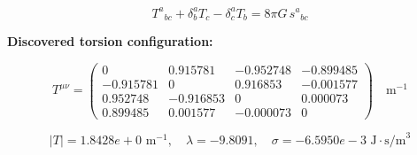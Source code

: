 
\begin{equation}
  T^a{}_{bc} + \delta^a_b T_c - \delta^a_c T_b = 8\pi G \, s^a{}_{bc}
\end{equation}

\textbf{Discovered torsion configuration:}

\begin{equation}
  T^{\mu\nu} = \begin{pmatrix}
    0 & 0.915781 & -0.952748 & -0.899485 \\
    -0.915781 & 0 & 0.916853 & -0.001577 \\
    0.952748 & -0.916853 & 0 & 0.000073 \\
    0.899485 & 0.001577 & -0.000073 & 0
  \end{pmatrix} \quad \text{m}^{-1}
\end{equation}

\begin{equation}
  |T| = 1.8428e+0 \text{ m}^{-1}, \quad
  \lambda = -9.8091, \quad
  \sigma = -6.5950e-3 \text{ J}\cdot\text{s/m}^3
\end{equation}